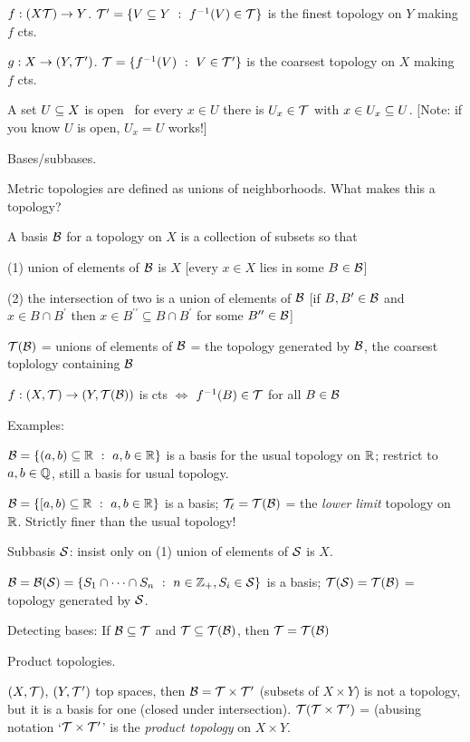 \documentclass[12pt]{article}
\begin{document}
$f:(X{\mathcal T})\rightarrow Y$. $\mt^\prime = \{V\subseteq Y\ :\ f^{-1}(V)\in\mt\}$ is the finest topology on $Y$
making $f$ cts.

$g:X\rightarrow (Y,{\mathcal T}^\prime)$. ${\mathcal T} = \{f^{-1}(V)\ :\ V\in{\mathcal T}^\prime\}$ is the coarsest topology on $X$
making $f$ cts.

A set $U\subseteq X$ is open \lra\ for every $x\in U$ there is $U_x\in{\mathcal T}$ with $x\in U_x\subseteq U$.
[Note: if you know $U$ is open, $U_x=U$ works!]

\msk

Bases/subbases.

Metric topologies are defined as unions of neighborhoods. What makes this a topology?

A basis ${\mathcal B}$ for a topology on $X$ is a collection of subsets so that

\hsk (1) union of elements of ${\mathcal B}$ is $X$ [every $x\in X$ lies in some $B\in{\mathcal B}$]

\hsk (2) the intersection of two is a union of elements of ${\mathcal B}$ [if $B,B^\prime\in{\mathcal B}$ and
$x\in B\cap B^\prime$ then $x\in B^{\prime\prime}\subseteq B\cap B^\prime$ for some
$B^{\prime\prime}\in{\mathcal B}$]

${\mathcal T}({\mathcal B})$ = unions of elements of ${\mathcal B}$ = the topology generated by ${\mathcal B}$,
the coarsest toplology containing ${\mathcal B}$

$f:(X,{\mathcal T})\rightarrow (Y,{\mathcal T}({\mathcal B}))$ is cts $\Leftrightarrow$ $f^{-1}(B)\in{\mathcal T}$ for all $B\in{\mathcal B}$

Examples:

$\mb = \{(a,b)\sset\bbr\ :\ a,b\in\bbr\}$ is a basis for the usual topology on ${\mathbb R}$;
restrict to $a,b\in{\mathbb Q}$, still a basis for usual topology.

$\mb = \{[a,b)\sset\bbr\ :\ a,b\in\bbr\}$ is a basis; ${\mathcal T}_\ell = {\mathcal T}({\mathcal B})$ = the {\it lower limit}
topology on ${\mathbb R}$. Strictly finer than the usual topology!

Subbasis ${\mathcal S}$: insist only on (1) union of elements of ${\mathcal S}$ is $X$.

$\mb = \mb(\ms) = \{S_1\cap\cdots\cap S_n\ :\ n\in\bbz_+, S_i\in\ms\}$ is a basis;
${\mathcal T}({\mathcal S}) = {\mathcal T}({\mathcal B})$ = topology generated by ${\mathcal S}$.

Detecting bases: If ${\mathcal B}\subseteq{\mathcal T}$ and ${\mathcal T}\subseteq{\mathcal T}({\mathcal B})$, then ${\mathcal T}={\mathcal T}({\mathcal B})$

\msk

Product topologies.

$(X,{\mathcal T})$, $(Y,{\mathcal T}^\prime)$ top spaces, then ${\mathcal B} = {\mathcal T}\times{\mathcal T}^\prime$ (subsets of $X\times Y$) is not a topology,
but it is a basis for one (closed under intersection). ${\mathcal T}({\mathcal T}\times{\mathcal T}^\prime)$ = (abusing notation
`${\mathcal T}\times{\mathcal T}^\prime$' is the {\it product topology} on $X\times Y$.
\end{document}
